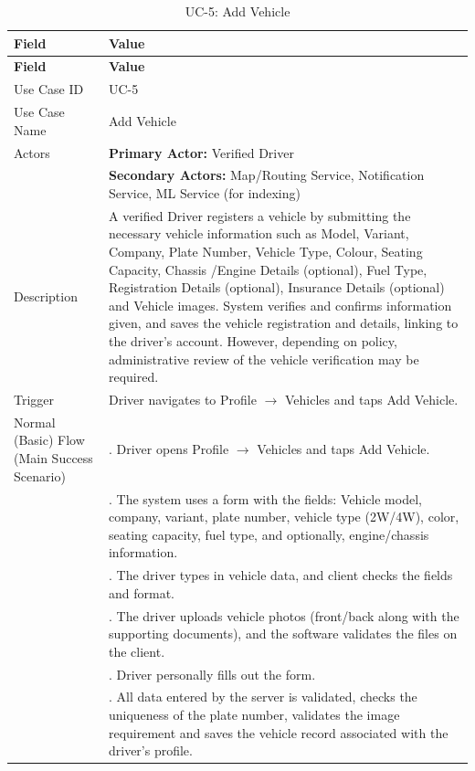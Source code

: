 \begin{longtable}{|>{\raggedright\arraybackslash}p{4cm}|>{\raggedright\arraybackslash}p{11cm}|}
\caption{UC-5: Add Vehicle}
\label{tab:uc-5} \\
\hline
\rowcolor{lightgray!30}
\textbf{Field} & \textbf{Value} \\
\hline
\endfirsthead
\hline
\rowcolor{lightgray!30}
\textbf{Field} & \textbf{Value} \\
\hline
\endhead
\hline
\endfoot
\hline
\endlastfoot
Use Case ID & UC-5 \\
\hline
Use Case Name & Add Vehicle \\
\hline
Actors & \textbf{Primary Actor:} Verified Driver \\
& \textbf{Secondary Actors:} Map/Routing Service, Notification Service, ML Service (for indexing) \\
\hline
Description & A verified Driver registers a vehicle by submitting the necessary vehicle information such as Model, Variant, Company, Plate Number, Vehicle Type, Colour, Seating Capacity, Chassis /Engine Details (optional), Fuel Type, Registration Details (optional), Insurance Details (optional) and Vehicle images. System verifies and confirms information given, and saves the vehicle registration and details, linking to the driver's account. However, depending on policy, administrative review of the vehicle verification may be required. \\
\hline
Trigger & Driver navigates to Profile $\rightarrow$ Vehicles and taps Add Vehicle. \\
\hline
Normal (Basic) Flow (Main Success Scenario) & 1. Driver opens Profile $\rightarrow$ Vehicles and taps Add Vehicle. \\
& 2. The system uses a form with the fields: Vehicle model, company, variant, plate number, vehicle type (2W/4W), color, seating capacity, fuel type, and optionally, engine/chassis information. \\
& 3. The driver types in vehicle data, and client checks the fields and format. \\
& 4. The driver uploads vehicle photos (front/back along with the supporting documents), and the software validates the files on the client. \\
& 5. Driver personally fills out the form. \\
& 6. All data entered by the server is validated, checks the uniqueness of the plate number, validates the image requirement and saves the vehicle record associated with the driver's profile. \\

\end{longtable}
